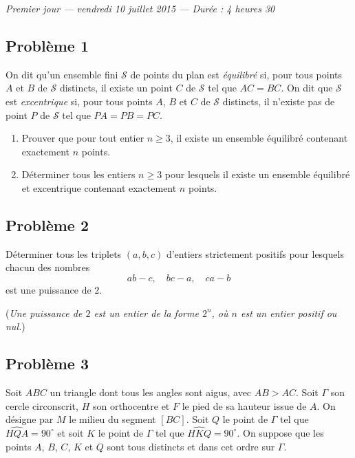 
\begin{center}
  \emph{Premier jour --- vendredi 10 juillet 2015 --- Durée : 4 heures 30}
\end{center}

\subsection*{Problème 1}
On dit qu'un ensemble fini $\mathcal{S}$ de points du plan est \emph{équilibré} si, pour tous points $A$ et $B$
de $\mathcal{S}$ distincts, il existe un point $C$ de $\mathcal{S}$ tel que $AC = BC$. On dit que $\mathcal{S}$
est \emph{excentrique} si, pour tous points $A$, $B$ et $C$ de $\mathcal{S}$ distincts, il n'existe pas de
point $P$ de $\mathcal{S}$ tel que $PA = PB = PC$.
\begin{enumerate}
  \item[(a)] Prouver que pour tout entier $n \geqslant 3$, il existe un ensemble équilibré contenant exactement
  $n$ points.
  \item[(b)] Déterminer tous les entiers $n \geqslant 3$ pour lesquels il existe un ensemble équilibré et
  excentrique contenant exactement $n$ points.
\end{enumerate}

\subsection*{Problème 2}
Déterminer tous les triplets $(a, b, c)$ d'entiers strictement positifs pour lesquels chacun des nombres
\[
ab - c, \quad bc - a, \quad ca - b
\]
est une puissance de $2$.

(\emph{Une puissance de $2$ est un entier de la forme $2^n$, où $n$ est un entier positif ou nul.})

\subsection*{Problème 3}
Soit $ABC$ un triangle dont tous les angles sont aigus, avec $AB > AC$. Soit $\Gamma$ son cercle circonscrit,
$H$ son orthocentre et $F$ le pied de sa hauteur issue de $A$. On désigne par $M$ le milieu du segment $[BC]$.
Soit $Q$ le point de $\Gamma$ tel que $\widehat{HQA} = 90^\circ$ et soit $K$ le point de $\Gamma$ tel que
$\widehat{HKQ} = 90^\circ$. On suppose que les points $A$, $B$, $C$, $K$ et $Q$ sont tous distincts et dans cet
ordre sur $\Gamma$.


